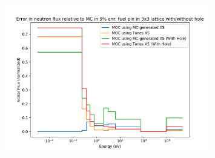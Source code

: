 \documentclass{beamer}
\begin{document}
\begin{frame}
\begin{figure}
\includegraphics[width=0.8\textwidth]{error_3x3_with_without_hole}
\end{figure}
\end{frame}




\begin{frame}
\end{frame}






\begin{frame}
\end{frame}






\begin{frame}
\end{frame}





\begin{frame}
\end{frame}
\end{document}
